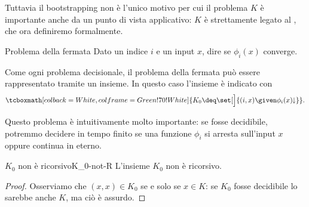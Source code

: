 \bigskip
\bigskip

Tuttavia il bootstrapping non è l'unico motivo per cui il problema $K$ è importante anche da un punto di vista applicativo: $K$ è strettamente legato al , che ora definiremo formalmente.

\begin{definition}
    {Problema della fermata}{}
    Dato un indice $i$ e un input $x$, dire se $\phi_i(x)$ converge.   
\end{definition}

Come ogni problema decisionale, il problema della fermata può essere rappresentato tramite un insieme. In questo caso l'insieme è indicato con \[
    \tcboxmath[colback=White, colframe=Green!70!White]{K_0 \deq \set[\Big]{(i, x) \given \phi_i(x)\conv}}. 
\]

Questo problema è intuitivamente molto importante: se fosse decidibile, potremmo decidere in tempo finito se una funzione $\phi_i$ si arresta sull'input $x$ oppure continua in eterno.

\begin{theorem}
    {$K_0$ non è ricorsivo}{K_0-not-R}
    L'insieme $K_0$ non è ricorsivo.
\end{theorem}
\begin{proof}
    Osserviamo che $(x, x) \in K_0$ se e solo se $x \in K$: se $K_0$ fosse decidibile lo sarebbe anche $K$, ma ciò è assurdo.    
\end{proof}